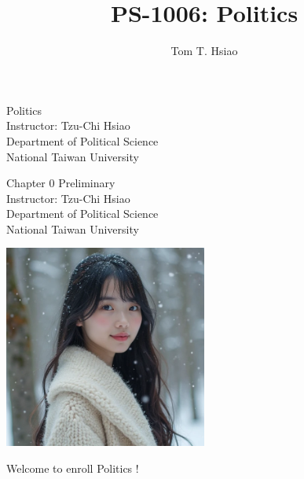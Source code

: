 \documentclass{beamer}
\title{PS-1006: Politics}
\author{Tom T. Hsiao}
\date{}
\begin{document}
\begin{frame}
\begin{center}
\Large{Politics} \\
\vspace{3em}
\normalsize{Instructor: Tzu-Chi Hsiao} \\
\vspace{3em}
\small{Department of Political Science} \\
\vspace{1em}
\small{National Taiwan University}
\end{center}
\end{frame}
\begin{frame}
\begin{center}
\Large{Chapter 0 Preliminary} \\
\vspace{3em}
\normalsize{Instructor: Tzu-Chi Hsiao} \\
\vspace{3em}
\small{Department of Political Science} \\
\vspace{1em}
\small{National Taiwan University} \\
\end{center}
\end{frame}
\begin{frame}{}
\begin{center}
\includegraphics[width=0.5\textwidth]{instructor.png}
\end{center}
\vspace{1em}
\begin{center}
\Large{Welcome to enroll Politics !} \\
\end{center}
\end{frame}
\end{document}
